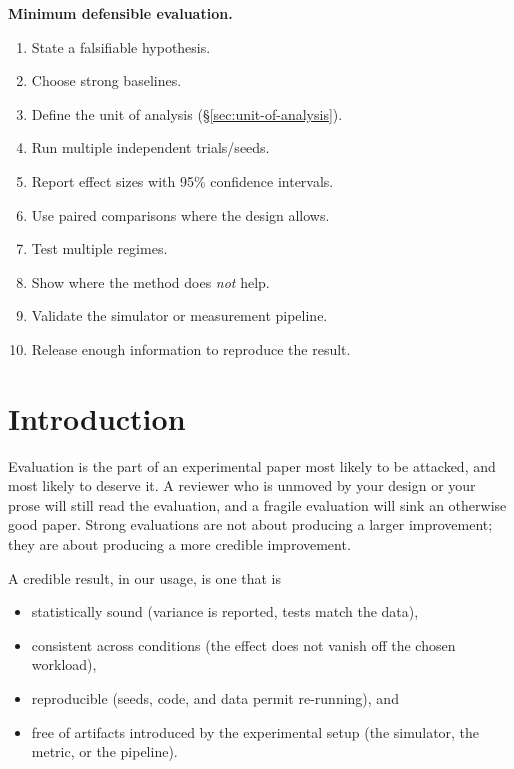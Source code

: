 \documentclass[11pt]{article}
\begin{document}
\begin{shaded*}
\noindent\textbf{Minimum defensible evaluation.}
\begin{enumerate}[leftmargin=*, itemsep=1pt, topsep=2pt]
    \item State a falsifiable hypothesis.
    \item Choose strong baselines.
    \item Define the unit of analysis (\S\ref{sec:unit-of-analysis}).
    \item Run multiple independent trials/seeds.
    \item Report effect sizes with 95\% confidence intervals.
    \item Use paired comparisons where the design allows.
    \item Test multiple regimes.
    \item Show where the method does \emph{not} help.
    \item Validate the simulator or measurement pipeline.
    \item Release enough information to reproduce the result.
\end{enumerate}
\end{shaded*}

\section{Introduction}
\label{sec:intro}

Evaluation is the part of an experimental paper most likely to be attacked, and most likely to deserve it. A reviewer who is unmoved by your design or your prose will still read the evaluation, and a fragile evaluation will sink an otherwise good paper. Strong evaluations are not about producing a larger improvement; they are about producing a more credible improvement.

A credible result, in our usage, is one that is

\begin{itemize}
    \item statistically sound (variance is reported, tests match the data),
    \item consistent across conditions (the effect does not vanish off the chosen workload),
    \item reproducible (seeds, code, and data permit re-running), and
    \item free of artifacts introduced by the experimental setup (the simulator, the metric, or the pipeline).
\end{itemize}
\end{document}
